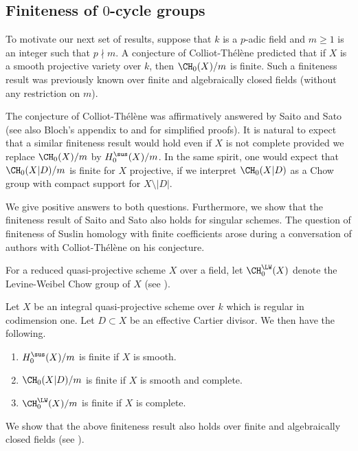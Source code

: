 \subsection{Finiteness of $0$-cycle groups}\label{sec:FF}
To motivate our next set of results, suppose that
$k$ is a $p$-adic field and $m \ge 1$ is an integer such that $p \nmid m$. A
conjecture of Colliot-Thélène predicted that if $X$ is a smooth projective
variety over $k$, then ${\CH_0(X)}/m$ is finite.
Such a finiteness result was previously known over finite and algebraically closed
fields (without any restriction on $m$).

The conjecture of Colliot-Thélène was affirmatively answered by
Saito and Sato~\cite{SaitoSatoAnnals} (see also Bloch's appendix to
\cite{EsnaultWittenberg} and
\cite{EKW} for simplified proofs).
It is natural to expect that a similar finiteness result would hold even if
$X$ is not complete provided we replace
${\CH_0(X)}/m$ by ${H^{\sus}_0(X)}/m$.
In the same spirit, one would expect that ${\CH_0(X|D)}/m$ is finite for $X$
projective, if we interpret ${\CH_0(X|D)}$ as a Chow group with compact support for
$X \setminus |D|$.

We give positive answers to both questions. Furthermore, we show that the finiteness
result of Saito and Sato also holds for singular schemes.
The question of finiteness of Suslin homology with finite coefficients arose during a
conversation of authors with Colliot-Thélène on his
conjecture.

For a reduced quasi-projective scheme $X$ over a field, let $\CH^{\LW}_0(X)$ denote the
Levine-Weibel Chow group of $X$ (see ).

\begin{thm}\label{thm:Main-4}
Let $X$ be an integral quasi-projective scheme over $k$ which is regular
in codimension one. Let $D \subset X$ be an effective Cartier divisor.
We then have the following.
\begin{enumerate}
\item\label{thm:Main-41}
${H^{\sus}_0(X)}/m$ is finite if $X$ is smooth.
\item\label{thm:Main-42}
${\CH_0(X|D)}/m$ is finite if $X$ is smooth and complete.
\item\label{thm:Main-43}
${\CH^{\LW}_0(X)}/m$ is finite if $X$ is complete.
\end{enumerate}
\end{thm}

We show that the above finiteness result also holds over finite and
algebraically closed fields (see ).

